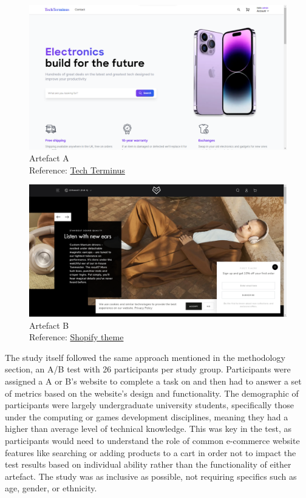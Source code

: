 \documentclass[article]{IEEEtran}
\begin{document}
        \begin{figure}[h]
            \caption{Artefact A \\\hspace{\textwidth} Reference: \href{http://www.tech-terminus.me/}{Tech Terminus}}
            \includegraphics[width=\columnwidth]{images/artefact/artefact-a.png}
        \end{figure}

        \begin{figure}[h]
            \caption{Artefact B \\\hspace{\textwidth} Reference: \href{https://beyours-theme-tech.myshopify.com/}{Shopify theme}}
            \includegraphics[width=\columnwidth]{images/artefact/artefact-b.png}
        \end{figure}

        The study itself followed the same approach mentioned in the methodology section, an A/B test with 26 participants per study group. Participants were assigned a A or B's website to complete a task on and then had to answer a set of metrics based on the website's design and functionality. The demographic of participants were largely undergraduate university students, specifically those under the computing or games development disciplines, meaning they had a higher than average level of technical knowledge. This was key in the test, as participants would need to understand the role of common e-commerce website features like searching or adding products to a cart in order not to impact the test results based on individual ability rather than the functionality of either artefact. The study was as inclusive as possible, not requiring specifics such as age, gender, or ethnicity.
        
\end{document}
